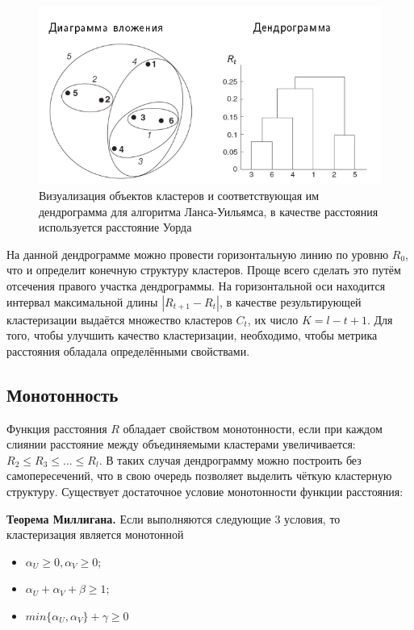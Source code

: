 \begin{center}
    \begin{figure}[H]
        \includegraphics[width=14cm]{chapters/clustering/images/Dendrogramma.png}
        \caption{Визуализация объектов кластеров и соответствующая им дендрограмма для алгоритма Ланса-Уильямса, в качестве расстояния используется расстояние Уорда}
        \label{fig:Dendrogramma}
    \end{figure}
\end{center}

На данной дендрограмме можно провести горизонтальную линию по уровню $R_0$, что и определит конечную структуру кластеров. Проще всего сделать это путём отсечения правого участка дендрограммы. На горизонтальной оси находится интервал максимальной длины $|R_{t+1} - R_t|$, в качестве результирующей кластеризации выдаётся множество кластеров $C_t$, их число $K = l - t + 1$. Для того, чтобы улучшить качество кластеризации, необходимо, чтобы метрика расстояния обладала определёнными свойствами.

\subsection*{Монотонность}

Функция расстояния $R$ обладает свойством монотонности, если при каждом слиянии расстояние между объединяемыми кластерами увеличивается: $R_2 \leq R_3 \leq...\leq R_l$. В таких случая дендрограмму можно построить без самопересечений, что в свою очередь позволяет выделить чёткую кластерную структуру. Существует достаточное условие монотонности функции расстояния:

\textbf{Теорема Миллигана.} Если выполняются следующие 3 условия, то кластеризация является монотонной
\begin{itemize}
    \item $\alpha_U \geq 0, \alpha_V \geq 0$;
    \item $\alpha_U + \alpha_V + \beta \geq 1;$
    \item $min \{{\alpha_U, \alpha_V}\} + \gamma \geq 0$
\end{itemize}

